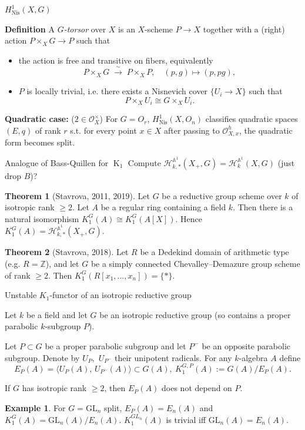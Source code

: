 \documentclass[handout]{beamer} %
\DeclareMathOperator{\K}{K}
\theoremstyle{definition}
\newtheorem*{thm}{Theorem}
\newtheorem*{exm}{Example}
\begin{document}
\begin{frame}{$H^1_{\mathrm{Nis}}(X,G)$ }

\textbf{Definition}
A \emph{$G$-torsor} over $X$ is an $X$-scheme $P \to X$ together with a (right) action
\( P \times_X G \to P \) such that

\begin{itemize}
\item the action is free and transitive on fibers, equivalently
\[ P \times_X G \;\xrightarrow{\;\sim\;}\; P \times_X P, \quad (p,g) \mapsto (p,pg), \]
\pause
\item $P$ is locally trivial, i.e. there exists a Nisnevich cover $\{U_i \to X\}$
such that \[ P \times_X U_i \cong G \times_X U_i . \]
\end{itemize}
\pause

\textbf{Quadratic case:} ($2 \in \mathcal{O}_X^\times$) For $G = O_r$, $H^1_{\mathrm{Nis}}(X,O_n)$ classifies quadratic spaces $(E,q)$ of rank $r$ s.t. for every point $x \in X$ after passing to $\mathcal{O}_{X,x}^h$, the quadratic form becomes split.
\end{frame}

\begin{frame}{Analogue of Bass-Quillen for $\K_1$}
 Compute $\mathcal{H}_{k,*}^{\mathbb{A}^1}(X_+, G) = \mathcal{H}_{k}^{\mathbb{A}^1}(X, G)$ (just drop $B$)?
\pause

 \begin{thm}[Stavrova, 2011, 2019]
 Let $G$ be a reductive group scheme over $k$ of isotropic rank $\geq 2$.
 Let $A$ be a regular ring containing a field $k$. Then there is a natural isomorphism
 $K_1^G(A) \cong K_1^G(A[X]).$
 Hence $K_1^G(A) = \mathcal{H}_{k,*}^{\mathbb{A}^1}(X_+, G)$.
 \end{thm}
\pause

 \begin{thm}[Stavrova, 2018]
  Let $R$ be a Dedekind domain of arithmetic type (e.g. $R=\mathbb{Z}$), and let $G$ be a simply connected Chevalley--Demazure group scheme of rank $\ge 2$. Then \( K_1^G(R[x_1,\ldots,x_n]) = \{ * \}. \)
 \end{thm}
\end{frame}

\begin{frame}{Unstable $K_1$-functor of an isotropic reductive group}

Let $k$ be a field and let $G$ be an isotropic reductive group (so contains a proper parabolic $k$-subgroup $P$).
\pause

Let $P \subset G$ be a proper parabolic subgroup and let $P^{-}$ be an opposite
parabolic subgroup. Denote by \( U_P,\) \(U_{P^-} \) their unipotent radicals.
For any $k$-algebra $A$ define
\[ E_P(A)=\langle U_P(A),\,U_{P^-}(A)\rangle \subset G(A),\ K_1^{G,P}(A) := G(A)/E_P(A).\]
\pause

If $G$ has isotropic rank $\ge 2$, then $E_P(A)$ does not depend on $P$.
\pause
\begin{exm}
 For $G=\mathrm{GL}_n$ split, \( E_P(A) = E_n(A) \) and \( K_1^G(A)=\mathrm{GL}_n(A)/E_n(A). \)
\pause
$K_1^{GL_n}(A)$ is trivial iff $\mathrm{GL}_n(A) = E_n(A)$.
\end{exm}
\end{frame}
\end{document}
